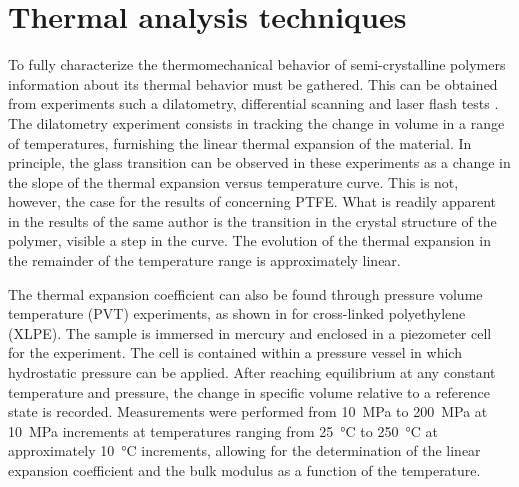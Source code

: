 %

\section{Thermal analysis techniques}

To fully characterize the thermomechanical behavior of semi-crystalline polymers information about its thermal behavior must be gathered.
This can be obtained from experiments such a dilatometry, differential scanning and laser flash tests \citep{blummCharacterizationPTFEUsing2010}.
The dilatometry experiment consists in tracking the change in volume in a range of temperatures, furnishing the linear thermal expansion of the material.
In principle, the glass transition can be observed in these experiments as a change in the slope of the thermal expansion versus temperature curve.
This is not, however, the case for the results of \cite{blummCharacterizationPTFEUsing2010} concerning PTFE.
What is readily apparent in the results of the same author is the transition in the crystal structure of the polymer, visible a step in the curve.
The evolution of the thermal expansion in the remainder of the temperature range is approximately linear.

The thermal expansion coefficient can also be found through pressure volume temperature (PVT) experiments, as shown in \cite{olaszViscoelasticModelCrossLinked2005} for cross-linked polyethylene (XLPE).
The sample is immersed in mercury and enclosed in a piezometer cell for the experiment.
The cell is contained within a pressure vessel in which hydrostatic pressure can be applied.
After reaching equilibrium at any constant temperature and pressure, the change in specific volume relative to a reference state is recorded.
Measurements were performed from \SI{10}{\mega\pascal} to \SI{200}{\mega\pascal} at \SI{10}{\mega\pascal} increments at temperatures ranging from \SI{25}{\celsius} to \SI{250}{\celsius} at approximately \SI{10}{\celsius} increments, allowing for the determination of the linear expansion coefficient and the bulk modulus as a function of the temperature.

